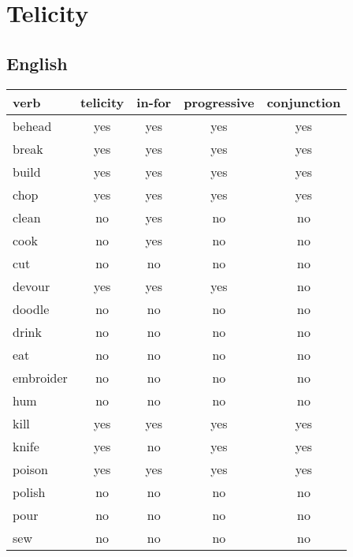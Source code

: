\section{Telicity} 

\subsection{English}

\begin{longtable}{lc|ccc}
\textbf{verb} & \textbf{telicity} & \textbf{in-for} & \textbf{progressive} & \textbf{conjunction}\\
\hline
\endhead
behead    & yes      & yes    & yes         & yes         \\
break     & yes      & yes    & yes         & yes         \\
build     & yes      & yes    & yes         & yes         \\
chop      & yes      & yes    & yes         & yes         \\
clean     & no       & yes    & no          & no          \\
cook      & no       & yes    & no          & no          \\
cut       & no       & no     & no          & no          \\
devour    & yes      & yes    & yes         & no          \\
doodle    & no       & no     & no          & no          \\
drink     & no       & no     & no          & no          \\
eat       & no       & no     & no          & no          \\
embroider & no       & no     & no          & no          \\
hum       & no       & no     & no          & no          \\
kill      & yes      & yes    & yes         & yes         \\
knife     & yes      & no     & yes         & yes         \\
poison    & yes      & yes    & yes         & yes         \\
polish    & no       & no     & no          & no          \\
pour      & no       & no     & no          & no          \\
sew       & no       & no     & no          & no          \\

\end{longtable}
